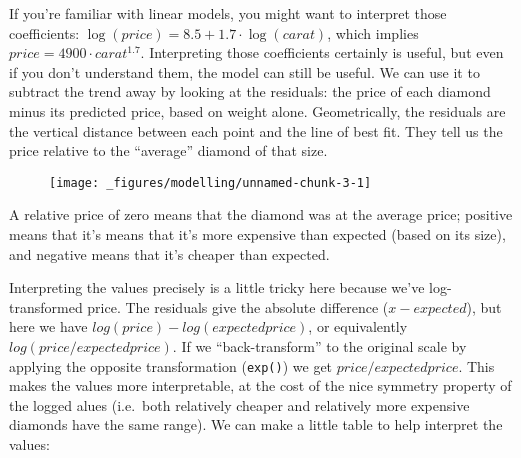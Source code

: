 \begin{Shaded}
\begin{Highlighting}[]
\StringTok{ }\StringTok{ } 
\NormalTok{(}
\end{Highlighting}
\end{Shaded}

If you're familiar with linear models, you might want to interpret those
coefficients: \(\log(price) = 8.5 + 1.7 \cdot \log(carat)\), which
implies \(price = 4900 \cdot carat ^ {1.7}\). Interpreting those
coefficients certainly is useful, but even if you don't understand them,
the model can still be useful. We can use it to subtract the trend away
by looking at the residuals: the price of each diamond minus its
predicted price, based on weight alone. Geometrically, the residuals are
the vertical distance between each point and the line of best fit. They
tell us the price relative to the ``average'' diamond of that size.

\begin{Shaded}
\end{Shaded}

\begin{figure}[H]
  \centering
  \texttt{[image: \_figures/modelling/unnamed-chunk-3-1]}
\end{figure}

A relative price of zero means that the diamond was at the average
price; positive means that it's means that it's more expensive than
expected (based on its size), and negative means that it's cheaper than
expected.

Interpreting the values precisely is a little tricky here because we've
log-transformed price. The residuals give the absolute difference
(\(x - expected\)), but here we have
\(log(price) - log(expected price)\), or equivalently
\(log(price / expected price)\). If we ``back-transform'' to the
original scale by applying the opposite transformation (\texttt{exp()})
we get \(price / expected price\). This makes the values more
interpretable, at the cost of the nice symmetry property of the logged
alues (i.e.~both relatively cheaper and relatively more expensive
diamonds have the same range). We can make a little table to help
interpret the values:

